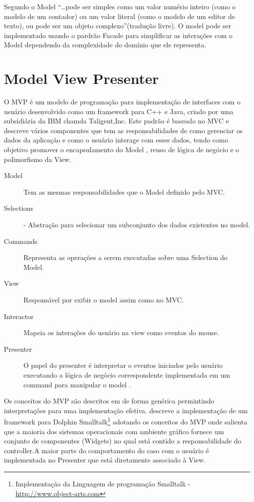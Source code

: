 Segundo  o Model ``\ldots pode ser simples como
um valor numério inteiro (como o modelo de um contador) ou um valor literal
(como o modelo de um editor de texto), ou pode ser um objeto
complexo''(tradução livre).
O model pode ser implementado usando o pardrão Facade para simplificar as
interações com o Model dependendo da complexidade do domínio que ele
representa.

\section{Model View Presenter}

O MVP é um modelo de programação para implementação de interfaces com o usuário
desenvolvido como um framework para C++ e Java, criado por uma subsidiária da
IBM chamda Taligent,Inc. Este padrão é baseado no MVC e descreve vários componentes que tem as
responsabilidades de como gerenciar os dados da aplicação e como o usuário
interage com esses dados, tendo como objetivo promover o encapsulamento do Model
, reuso de lógica de negócio e o polimorfismo da View.

\begin{description}
  \item[Model] Tem as mesmas responsabilidades que o Model definido pelo MVC.
  \item[Selections] - Abstração para selecionar um subconjunto dos dados
  existentes no model.
  \item [Commands] Representa as operações a serem executadas sobre uma
  Selection do Model.
  \item [View] Responsável por exibir o model assim como no MVC.
  \item [Interactor] Mapeia os interações do usuário na view como eventos do
  mouse.
  \item [Presenter] O papel do presenter é interpretar o eventos iniciados pelo
  usuário executando a lógica de negócio correspondente implementada em um
  command para manipular o model \cite{Potel96mvp}.
\end{description}


Os conceitos do MVP são descritos em  de forma genérica
permintindo interpretações para uma implementação efetiva.
 descreve a implementação de um framework para
Dolphin Smalltalk\footnote{Implementação da Linguagem de programação Smalltalk - 
\url{http://www.object-arts.com}} adotando os conceitos do MVP onde salienta que
a maioria dos sistemas operacionais com ambiente gráfico fornece um conjunto de
componentes (Widgets) no qual está contido a responsabilidade do controller.A
maior parte do comportamento do caso com o usuário é implementada no
Presenter que está diretamente associado à View.

